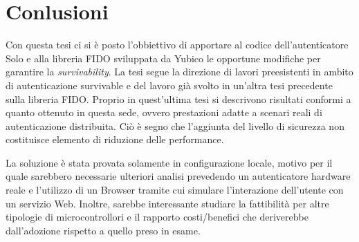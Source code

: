 \chapter{Conlusioni}
\label{conclusioni}

Con questa tesi ci si è posto l'obbiettivo di apportare al codice dell'autenticatore Solo e alla libreria FIDO sviluppata da Yubico le opportune modifiche per garantire la \emph{survivability}. La tesi segue la direzione di lavori preesistenti in ambito di autenticazione survivable \cite{magnanini:survivable} e del lavoro già svolto in un'altra tesi precedente sulla libreria FIDO. Proprio in quest'ultima tesi si descrivono risultati conformi a quanto ottenuto in questa sede, ovvero prestazioni adatte a scenari reali di autenticazione distribuita. Ciò è segno che l'aggiunta del livello di sicurezza non costituisce elemento di riduzione delle performance.

La soluzione è stata provata solamente in configurazione locale, motivo per il quale sarebbero necessarie ulteriori analisi prevedendo un autenticatore hardware reale e l'utilizzo di un Browser tramite cui simulare l'interazione dell'utente con un servizio Web. Inoltre, sarebbe interessante studiare la fattibilità per altre tipologie di microcontrollori e il rapporto costi/benefici che deriverebbe dall'adozione rispetto a quello preso in esame. 